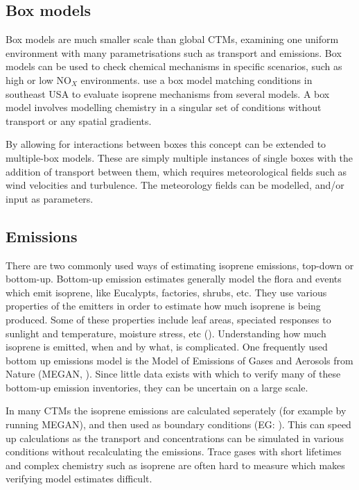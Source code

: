   
  \subsection{Box models}
    Box models are much smaller scale than global CTMs, examining one uniform environment with many parametrisations such as transport and emissions.
    Box models can be used to check chemical mechanisms in specific scenarios, such as high or low NO$_X$ environments.
    \cite{Marvin2017} use a box model matching conditions in southeast USA to evaluate isoprene mechanisms from several models.  
    A box model involves modelling chemistry in a singular set of conditions without transport or any spatial gradients.
    
    By allowing for interactions between boxes this concept can be extended to multiple-box models.
    These are simply multiple instances of single boxes with the addition of transport between them, which requires meteorological fields such as wind velocities and turbulence.
    The meteorology fields can be modelled, and/or input as parameters.
  
  
  \subsection{Emissions}
  
    There are two commonly used ways of estimating isoprene emissions, top-down or bottom-up.
    Bottom-up emission estimates generally model the flora and events which emit isoprene, like Eucalypts, factories, shrubs, etc.
    They use various properties of the emitters in order to estimate how much isoprene is being produced.
    Some of these properties include leaf areas, speciated responses to sunlight and temperature, moisture stress, etc (\cite{Guenther1995,Guenther2006}).
    Understanding how much isoprene is emitted, when and by what, is complicated.
    One frequently used bottom up emissions model is the Model of Emissions of Gases and Aerosols from Nature (MEGAN, \cite{Guenther1995}).
    Since little data exists with which to verify many of these bottom-up emission inventories, they can be uncertain on a large scale.
    
    In many CTMs the isoprene emissions are calculated seperately (for example by running MEGAN), and then used as boundary conditions (EG: \cite{Guenther2006}). 
    This can speed up calculations as the transport and concentrations can be simulated in various conditions without recalculating the emissions.
    Trace gases with short lifetimes and complex chemistry such as isoprene are often hard to measure which makes verifying model estimates difficult.
    

